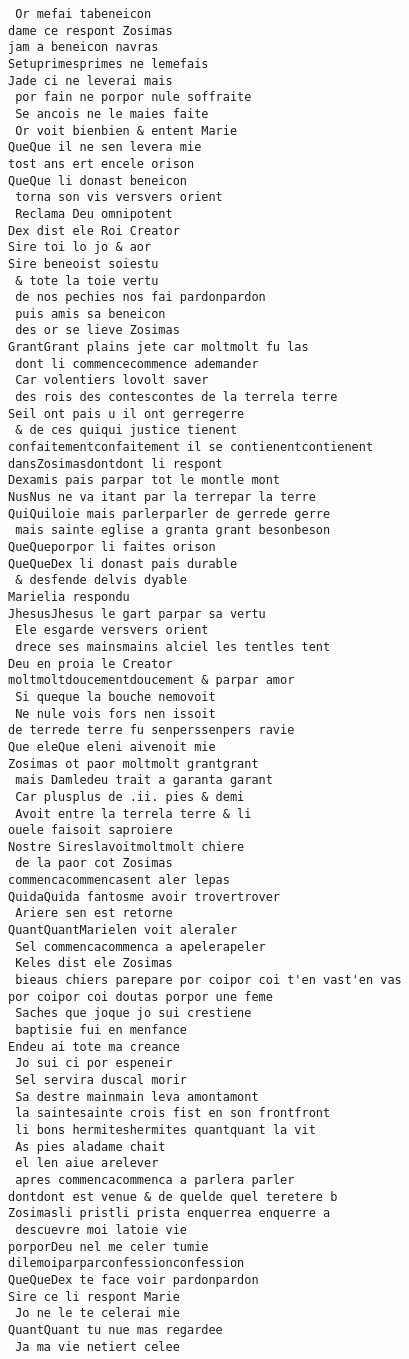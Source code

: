 \documentclass[
  letterpaper,
  DIV=11,
  numbers=noendperiod]{scrreprt}
\begin{document}
\begin{verbatim}
 Or mefai tabeneicon
dame ce respont Zosimas
jam a beneicon navras
Setuprimesprimes ne lemefais
Jade ci ne leverai mais
 por fain ne porpor nule soffraite
 Se ancois ne le maies faite
 Or voit bienbien & entent Marie
QueQue il ne sen levera mie
tost ans ert encele orison
QueQue li donast beneicon
 torna son vis versvers orient
 Reclama Deu omnipotent
Dex dist ele Roi Creator
Sire toi lo jo & aor
Sire beneoist soiestu
 & tote la toie vertu
 de nos pechies nos fai pardonpardon
 puis amis sa beneicon
 des or se lieve Zosimas
GrantGrant plains jete car moltmolt fu las
 dont li commencecommence ademander
 Car volentiers lovolt saver
 des rois des contescontes de la terrela terre
Seil ont pais u il ont gerregerre
 & de ces quiqui justice tienent
confaitementconfaitement il se contienentcontienent
dansZosimasdontdont li respont
Dexamis pais parpar tot le montle mont
NusNus ne va itant par la terrepar la terre
QuiQuiloie mais parlerparler de gerrede gerre
 mais sainte eglise a granta grant besonbeson
QueQueporpor li faites orison
QueQueDex li donast pais durable
 & desfende delvis dyable
Marielia respondu
JhesusJhesus le gart parpar sa vertu
 Ele esgarde versvers orient
 drece ses mainsmains alciel les tentles tent
Deu en proia le Creator
moltmoltdoucementdoucement & parpar amor
 Si queque la bouche nemovoit
 Ne nule vois fors nen issoit
de terrede terre fu senperssenpers ravie
Que eleQue eleni aivenoit mie
Zosimas ot paor moltmolt grantgrant
 mais Damledeu trait a garanta garant
 Car plusplus de .ii. pies & demi
 Avoit entre la terrela terre & li
ouele faisoit saproiere
Nostre Sireslavoitmoltmolt chiere
 de la paor cot Zosimas
commencacommencasent aler lepas
QuidaQuida fantosme avoir trovertrover
 Ariere sen est retorne
QuantQuantMarielen voit aleraler
 Sel commencacommenca a apelerapeler
 Keles dist ele Zosimas
 bieaus chiers parepare por coipor coi t'en vast'en vas
por coipor coi doutas porpor une feme
 Saches que joque jo sui crestiene
 baptisie fui en menfance
Endeu ai tote ma creance
 Jo sui ci por espeneir
 Sel servira duscal morir
 Sa destre mainmain leva amontamont
 la saintesainte crois fist en son frontfront
 li bons hermiteshermites quantquant la vit
 As pies aladame chait
 el len aiue arelever
 apres commencacommenca a parlera parler
dontdont est venue & de quelde quel teretere b
Zosimasli pristli prista enquerrea enquerre a
 descuevre moi latoie vie
porporDeu nel me celer tumie
dilemoiparparconfessionconfession
QueQueDex te face voir pardonpardon
Sire ce li respont Marie
 Jo ne le te celerai mie
QuantQuant tu nue mas regardee
 Ja ma vie netiert celee

\end{verbatim}
\end{document}
